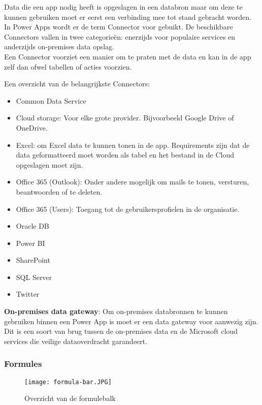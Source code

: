 Data die een app nodig heeft is opgeslagen in een databron maar om deze te kunnen gebruiken moet er eerst een verbinding mee tot stand gebracht worden. In Power Apps wordt er de term Connector voor gebuikt. De beschikbare Connectors vallen in twee categorieën: enerzijds voor populaire services en anderzijds on-premises data opslag. \\
Een Connector voorziet een manier om te praten met de data en kan in de app zelf dan ofwel tabellen of acties voorzien.

Een overzicht van de belangrijkste Connectors:
\begin{itemize}
    \item Common Data Service
    \item Cloud storage: Voor elke grote provider. Bijvoorbeeld Google Drive of OneDrive.
    \item Excel: om Excel data te kunnen tonen in de app. Requirements zijn dat de data geformatteerd moet worden als tabel en het bestand in de Cloud opgeslagen moet zijn.
    \item Office 365 (Outlook): Onder andere mogelijk om mails te tonen, versturen, beantwoorden of te deleten.
    \item Office 365 (Users): Toegang tot de gebruikersprofielen in de organisatie.
    \item Oracle DB
    \item Power BI
    \item SharePoint
    \item SQL Server
    \item Twitter
\end{itemize} \autocite{MicrosoftDocs2020b}

\textbf{On-premises data gateway}: Om on-premises databronnen te kunnen gebruiken binnen een Power App is moet er een data gateway voor aanwezig zijn. Dit is een soort van brug tussen de on-premises data en de Microsoft cloud services die veilige dataoverdracht garandeert. \autocite{MicrosoftDocs2019b}

\subsubsection{Formules}

\begin{figure}[h!]
    \texttt{[image: formula-bar.JPG]}
    \caption{Overzicht van de formulebalk \autocite{MicrosoftDocs2019c}}
    \label{fig:msformulebalk}
\end{figure}

